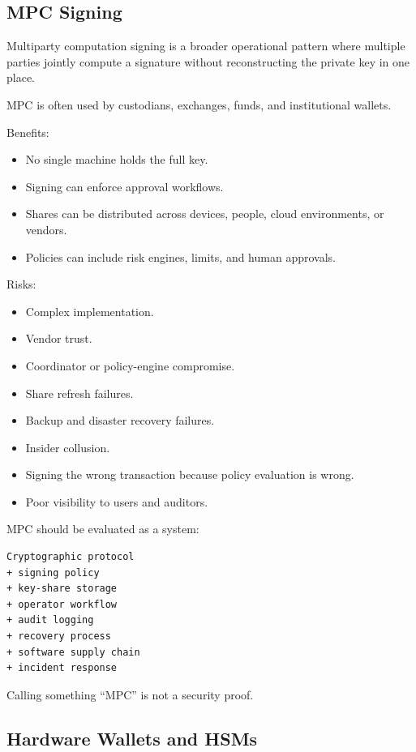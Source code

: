 \subsection{MPC Signing}

Multiparty computation signing is a broader operational pattern where
multiple parties jointly compute a signature without reconstructing the
private key in one place.

MPC is often used by custodians, exchanges, funds, and institutional
wallets.

Benefits:

\begin{itemize}
\tightlist
\item
  No single machine holds the full key.
\item
  Signing can enforce approval workflows.
\item
  Shares can be distributed across devices, people, cloud environments,
  or vendors.
\item
  Policies can include risk engines, limits, and human approvals.
\end{itemize}

Risks:

\begin{itemize}
\tightlist
\item
  Complex implementation.
\item
  Vendor trust.
\item
  Coordinator or policy-engine compromise.
\item
  Share refresh failures.
\item
  Backup and disaster recovery failures.
\item
  Insider collusion.
\item
  Signing the wrong transaction because policy evaluation is wrong.
\item
  Poor visibility to users and auditors.
\end{itemize}

MPC should be evaluated as a system:

\begin{lstlisting}
Cryptographic protocol
+ signing policy
+ key-share storage
+ operator workflow
+ audit logging
+ recovery process
+ software supply chain
+ incident response
\end{lstlisting}

Calling something ``MPC'' is not a security proof.

\subsection{Hardware Wallets and HSMs}


